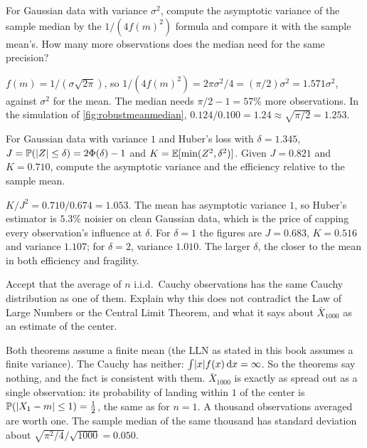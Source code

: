 \begin{exercise}
\label{ex:mest-gauss-median}
For Gaussian data with variance $\sigma^2$, compute the asymptotic variance of the sample median by the $1/(4f(m)^2)$ formula and compare it with the sample mean's. How many more observations does the median need for the same precision?
\end{exercise}
\begin{solution}
$f(m) = 1/(\sigma\sqrt{2\pi})$, so $1/(4f(m)^2) = 2\pi\sigma^2/4 = (\pi/2)\sigma^2 = 1.571\sigma^2$, against $\sigma^2$ for the mean. The median needs $\pi/2 - 1 = 57\%$ more observations. In the simulation of \cref{fig:robustmeanmedian}, $0.124/0.100 = 1.24 \approx \sqrt{\pi/2} = 1.253$.
\end{solution}

\begin{exercise}
\label{ex:mest-huber-gauss}
For Gaussian data with variance $1$ and Huber's loss with $\delta = 1.345$, $J = \mathbb{P}(\lvert Z\rvert \leq \delta) = 2\Phi(\delta) - 1$ and $K = \operatorname*{\mathbb{E}}[\min(Z^2, \delta^2)]$. Given $J = 0.821$ and $K = 0.710$, compute the asymptotic variance and the efficiency relative to the sample mean.
\end{exercise}
\begin{solution}
$K/J^2 = 0.710/0.674 = 1.053$. The mean has asymptotic variance $1$, so Huber's estimator is $5.3\%$ noisier on clean Gaussian data, which is the price of capping every observation's influence at $\delta$. For $\delta = 1$ the figures are $J = 0.683$, $K = 0.516$ and variance $1.107$; for $\delta = 2$, variance $1.010$. The larger $\delta$, the closer to the mean in both efficiency and fragility.
\end{solution}

\begin{exercise}
\label{ex:mest-cauchy-avg}
Accept that the average of $n$ i.i.d.\ Cauchy observations has the same Cauchy distribution as one of them. Explain why this does not contradict the Law of Large Numbers or the Central Limit Theorem, and what it says about $\bar{X}_{1000}$ as an estimate of the center.
\end{exercise}
\begin{solution}
Both theorems assume a finite mean (the LLN as stated in this book assumes a finite variance). The Cauchy has neither: $\int\lvert x\rvert f(x)\,\mathrm{d}x = \infty$. So the theorems say nothing, and the fact is consistent with them. $\bar{X}_{1000}$ is exactly as spread out as a single observation: its probability of landing within $1$ of the center is $\mathbb{P}(\lvert X_1 - m\rvert \leq 1) = \frac12$, the same as for $n = 1$. A thousand observations averaged are worth one. The sample median of the same thousand has standard deviation about $\sqrt{\pi^2/4}/\sqrt{1000} = 0.050$.
\end{solution}

